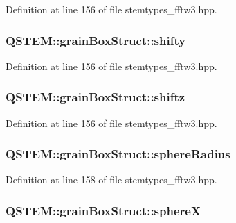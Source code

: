Definition at line 156 of file stemtypes\-\_\-fftw3.\-hpp.

\hypertarget{struct_q_s_t_e_m_1_1grain_box_struct_af78b5e3e966edf10c28ef2941ff10ec2}{
\subsubsection[{shifty}]{ Q\-S\-T\-E\-M\-::grain\-Box\-Struct\-::shifty}}\label{struct_q_s_t_e_m_1_1grain_box_struct_af78b5e3e966edf10c28ef2941ff10ec2}


Definition at line 156 of file stemtypes\-\_\-fftw3.\-hpp.

\hypertarget{struct_q_s_t_e_m_1_1grain_box_struct_a524264d9966d7a7abc0d1f88a19487e7}{
\subsubsection[{shiftz}]{ Q\-S\-T\-E\-M\-::grain\-Box\-Struct\-::shiftz}}\label{struct_q_s_t_e_m_1_1grain_box_struct_a524264d9966d7a7abc0d1f88a19487e7}


Definition at line 156 of file stemtypes\-\_\-fftw3.\-hpp.

\hypertarget{struct_q_s_t_e_m_1_1grain_box_struct_a7f3590d10cf90279d5ca9a3877c3e700}{
\subsubsection[{sphere\-Radius}]{ Q\-S\-T\-E\-M\-::grain\-Box\-Struct\-::sphere\-Radius}}\label{struct_q_s_t_e_m_1_1grain_box_struct_a7f3590d10cf90279d5ca9a3877c3e700}


Definition at line 158 of file stemtypes\-\_\-fftw3.\-hpp.

\hypertarget{struct_q_s_t_e_m_1_1grain_box_struct_a3d46789fadc11105f58e146ebbb1285b}{
\subsubsection[{sphere\-X}]{ Q\-S\-T\-E\-M\-::grain\-Box\-Struct\-::sphere\-X}}\label{struct_q_s_t_e_m_1_1grain_box_struct_a3d46789fadc11105f58e146ebbb1285b}


